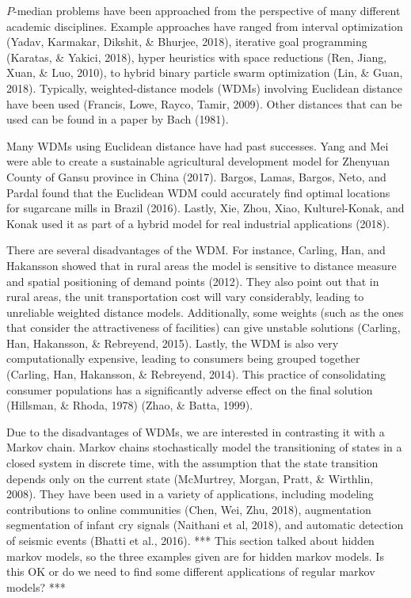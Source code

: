 \documentclass[twoside,twocolumn]{article}
\begin{document}
$P$-median problems have been approached from the perspective of many different academic disciplines.
Example approaches have ranged from interval optimization (Yadav, Karmakar, Dikshit, \& Bhurjee, 2018), iterative goal programming (Karatas, \& Yakici, 2018), hyper heuristics with space reductions (Ren, Jiang, Xuan, \& Luo, 2010), to hybrid binary particle swarm optimization (Lin, \& Guan, 2018).
Typically, weighted-distance models (WDMs) involving Euclidean distance have been used (Francis, Lowe, Rayco, Tamir, 2009).
Other distances that can be used can be found in a paper by Bach (1981).

Many WDMs using Euclidean distance have had past successes.
Yang and Mei were able to create a sustainable agricultural development model for Zhenyuan County of Gansu province in China (2017).
Bargos, Lamas, Bargos, Neto, and Pardal found that the Euclidean WDM could accurately find optimal locations for sugarcane mills in Brazil (2016).
Lastly, Xie, Zhou, Xiao, Kulturel-Konak, and Konak used it as part of a hybrid model for real industrial applications (2018).

There are several disadvantages of the WDM.
For instance, Carling, Han, and Hakansson showed that in rural areas the model is sensitive to distance measure and spatial positioning of demand points (2012).
They also point out that in rural areas, the unit transportation cost will vary considerably, leading to unreliable weighted distance models.
Additionally, some weights (such as the ones that consider the attractiveness of facilities) can give unstable solutions (Carling, Han, Hakansson, \& Rebreyend, 2015).
Lastly, the WDM is also very computationally expensive, leading to consumers being grouped together (Carling, Han, Hakansson, 
\& Rebreyend, 2014). 
This practice of consolidating consumer populations has a significantly adverse effect on the final solution (Hillsman, \& Rhoda, 1978) (Zhao, \& Batta, 1999).

Due to the disadvantages of WDMs, we are interested in contrasting it with a Markov chain.
Markov chains stochastically model the transitioning of states in a closed system in discrete time, with the assumption that the state transition depends only on the current state (McMurtrey, Morgan, Pratt, \& Wirthlin, 2008).
They have been used in a variety of applications, including modeling contributions to online communities (Chen, Wei, Zhu, 2018), augmentation segmentation of infant cry signals (Naithani et al, 2018), and automatic detection of seismic events (Bhatti et al., 2016).
*** This section talked about hidden markov models, so the three examples given are for hidden markov models.  Is this OK or do we need to find some different applications of regular markov models? ***
\end{document}
